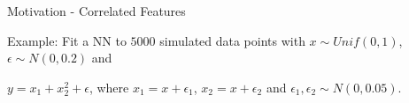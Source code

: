 \documentclass[11pt,compress,t,notes=noshow, aspectratio=169, xcolor=table]{beamer}
\begin{document}
\begin{frame}{Motivation - Correlated Features}


Example: Fit a NN to $5000$ simulated data points with $x \sim Unif(0,1)$, $\epsilon \sim N(0, 0.2)$ and

\centerline{$y = x_1 + x_2^2 + \epsilon$, where
$x_1 = x + \epsilon_1$, 
$x_2 = x + \epsilon_2$ and $\epsilon_1, \epsilon_2 \sim N(0, 0.05)$.}

\begin{columns}[T]
\begin{column}{0.65\textwidth}
\centering
{}
\end{column}
\begin{column}{0.35\textwidth}


\end{column}
\end{columns}
\end{frame}
\end{document}
